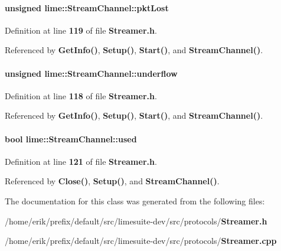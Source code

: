 \paragraph[{pkt\+Lost}]{\setlength{\rightskip}{0pt plus 5cm}unsigned lime\+::\+Stream\+Channel\+::pkt\+Lost}\label{classlime_1_1StreamChannel_a29f5c63dbde00e288f486b7a12719b45}


Definition at line {\bf 119} of file {\bf Streamer.\+h}.



Referenced by {\bf Get\+Info()}, {\bf Setup()}, {\bf Start()}, and {\bf Stream\+Channel()}.

\paragraph[{underflow}]{\setlength{\rightskip}{0pt plus 5cm}unsigned lime\+::\+Stream\+Channel\+::underflow}\label{classlime_1_1StreamChannel_af3f2002651bda8d3f56dff2d659fe7f2}


Definition at line {\bf 118} of file {\bf Streamer.\+h}.



Referenced by {\bf Get\+Info()}, {\bf Setup()}, {\bf Start()}, and {\bf Stream\+Channel()}.

\paragraph[{used}]{\setlength{\rightskip}{0pt plus 5cm}bool lime\+::\+Stream\+Channel\+::used}\label{classlime_1_1StreamChannel_a31a5675002ab56ae3ebc5cf256916876}


Definition at line {\bf 121} of file {\bf Streamer.\+h}.



Referenced by {\bf Close()}, {\bf Setup()}, and {\bf Stream\+Channel()}.



The documentation for this class was generated from the following files\+:\begin{DoxyCompactItemize}
\item 
/home/erik/prefix/default/src/limesuite-\/dev/src/protocols/{\bf Streamer.\+h}\item 
/home/erik/prefix/default/src/limesuite-\/dev/src/protocols/{\bf Streamer.\+cpp}\end{DoxyCompactItemize}
